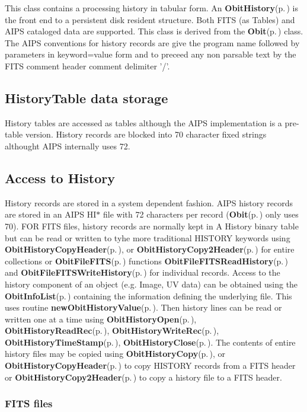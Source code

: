 This class contains a processing history in tabular form. An {\bf Obit\-History}{\rm (p.\,\pageref{structObitHistory})} is the front end to a persistent disk resident structure. Both FITS (as Tables) and AIPS cataloged data are supported. This class is derived from the {\bf Obit}{\rm (p.\,\pageref{structObit})} class. The AIPS conventions for history records are give the program name followed by parameters in keyword=value form and to preceed any non parsable text by the FITS comment header comment delimiter '/'.\subsection{History\-Table data storage}\label{ObitTableWX_8h_TableDataStorage}
History tables are accessed as tables although the AIPS implementation is a pre-table version. History records are blocked into 70 character fixed strings althought AIPS internally uses 72.\subsection{Access to History}\label{ObitHistory_8h_ObitHistorySpecification}
History records are stored in a system dependent fashion. AIPS history records are stored in an AIPS HI$\ast$ file with 72 characters per record ({\bf Obit}{\rm (p.\,\pageref{structObit})} only uses 70). FOR FITS files, history records are normally kept in A History binary table but can be read or written to tyhe more traditional HISTORY keywords using {\bf Obit\-History\-Copy\-Header}{\rm (p.\,\pageref{ObitHistory_8c_a12})}, or {\bf Obit\-History\-Copy2Header}{\rm (p.\,\pageref{ObitHistory_8c_a13})} for entire collections or {\bf Obit\-File\-FITS}{\rm (p.\,\pageref{structObitFileFITS})} functions {\bf Obit\-File\-FITSRead\-History}{\rm (p.\,\pageref{ObitFileFITS_8c_a21})} and {\bf Obit\-File\-FITSWrite\-History}{\rm (p.\,\pageref{ObitFileFITS_8c_a26})} for individual records. Access to the history component of an object (e.g. Image, UV data) can be obtained using the {\bf Obit\-Info\-List}{\rm (p.\,\pageref{structObitInfoList})} containing the information defining the underlying file. This uses routine {\bf new\-Obit\-History\-Value}{\rm (p.\,\pageref{ObitHistory_8c_a8})}. Then history lines can be read or written one at a time using {\bf Obit\-History\-Open}{\rm (p.\,\pageref{ObitHistory_8c_a15})}, {\bf Obit\-History\-Read\-Rec}{\rm (p.\,\pageref{ObitHistory_8c_a17})}, {\bf Obit\-History\-Write\-Rec}{\rm (p.\,\pageref{ObitHistory_8c_a18})}, {\bf Obit\-History\-Time\-Stamp}{\rm (p.\,\pageref{ObitHistory_8c_a19})}, {\bf Obit\-History\-Close}{\rm (p.\,\pageref{ObitHistory_8c_a16})}. The contents of entire history files may be copied using {\bf Obit\-History\-Copy}{\rm (p.\,\pageref{ObitHistory_8c_a11})}, or {\bf Obit\-History\-Copy\-Header}{\rm (p.\,\pageref{ObitHistory_8c_a12})} to copy HISTORY records from a FITS header or {\bf Obit\-History\-Copy2Header}{\rm (p.\,\pageref{ObitHistory_8c_a13})} to copy a history file to a FITS header.\subsubsection{FITS files}\label{ObitTableWX_8h_TableFITS}
